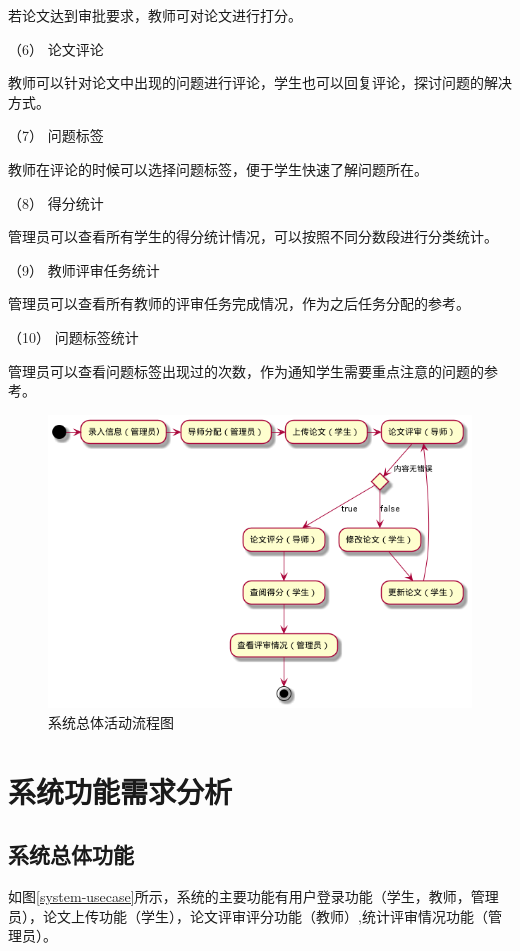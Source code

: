 若论文达到审批要求，教师可对论文进行打分。

（6） 论文评论

教师可以针对论文中出现的问题进行评论，学生也可以回复评论，探讨问题的解决方式。

（7） 问题标签

教师在评论的时候可以选择问题标签，便于学生快速了解问题所在。

（8） 得分统计

管理员可以查看所有学生的得分统计情况，可以按照不同分数段进行分类统计。

（9） 教师评审任务统计

管理员可以查看所有教师的评审任务完成情况，作为之后任务分配的参考。

（10） 问题标签统计

管理员可以查看问题标签出现过的次数，作为通知学生需要重点注意的问题的参考。

\begin{figure}[htbp]
      \centering
      \includegraphics[scale = 0.65]{out/uml/流程图/系统总体活动流程图/系统总体活动流程图.png}
      \caption{\song\wuhao 系统总体活动流程图}
\end{figure}


\section{系统功能需求分析}

\subsection{系统总体功能}

如图\ref{system-usecase}所示，系统的主要功能有用户登录功能（学生，教师，管理员），论文上传功能（学生），论文评审评分功能（教师）,统计评审情况功能（管理员）。

